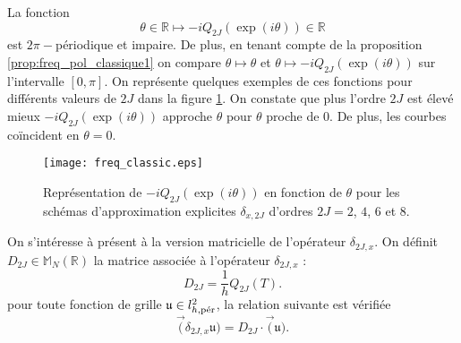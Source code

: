 La fonction
\begin{equation}
\theta \in \mathbb{R} \mapsto - i Q_{2J}(\exp(i \theta)) \in \mathbb{R}
\end{equation}
est $2 \pi -$périodique et impaire. De plus, en tenant compte de la proposition \ref{prop:freq_pol_classique1} on compare $\theta \mapsto \theta$  et $\theta \mapsto - i Q_{2J}(\exp(i \theta))$ sur l'intervalle $[0,\pi]$. On représente quelques exemples de ces fonctions pour différents valeurs de $2J$ dans la figure \ref{fig:freq_classic}. On constate que plus l'ordre $2J$ est élevé mieux $- i Q_{2J}(\exp(i \theta))$ approche $\theta$ pour $\theta$ proche de $0$. De plus, les courbes coïncident en $\theta = 0$.

\begin{figure}[htbp]
\begin{center}
\texttt{[image: freq\_classic.eps]}
\end{center}
\caption{Représentation de $-i Q_{2J}\left( \exp(i \theta) \right)$ en fonction de $\theta$ pour les schémas d'approximation explicites $\delta_{x,2J}$ d'ordres $2J = 2$, $4$, $6$ et $8$.}
\label{fig:freq_classic}
\end{figure}

On s'intéresse à présent à la version matricielle de l'opérateur $\delta_{2J,x}$. On définit $D_{2J} \in \mathbb{M}_N(\mathbb{R})$ la matrice associée à l'opérateur $\delta_{2J,x}$ :
\begin{equation}
D_{2J} = \dfrac{1}{h} Q_{2J}(T).
\label{eq:matrice_explicite}
\end{equation}
pour toute fonction de grille $\mathfrak{u} \in l^2_{h,\per}$, la relation suivante est vérifiée
\begin{equation}
\vec(\delta_{2J,x} \mathfrak{u}) = D_{2J} \cdot \vec ( \mathfrak{u} ).
\end{equation}

